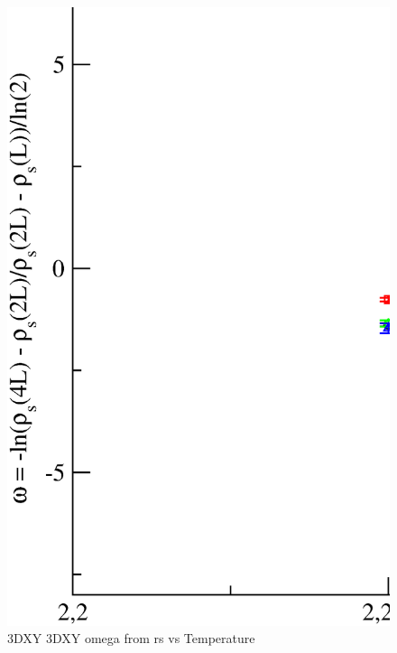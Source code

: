 \begin{figure}[!htpb]
  \centering
  \includegraphics[width=\textwidth]{./plots/3DXY/3DXY_omega_from_rs_vs_Temperature.eps}
  \caption{3DXY 3DXY omega from rs vs Temperature}
\end{figure}

